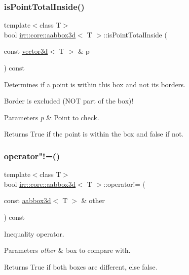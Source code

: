 \subsubsection{\texorpdfstring{is\+Point\+Total\+Inside()}{isPointTotalInside()}}
{\footnotesize\ttfamily template$<$class T$>$ \\
bool \hyperlink{classirr_1_1core_1_1aabbox3d}{irr\+::core\+::aabbox3d}$<$ T $>$\+::is\+Point\+Total\+Inside (\begin{DoxyParamCaption}\item[{const \hyperlink{classirr_1_1core_1_1vector3d}{vector3d}$<$ T $>$ \&}]{p }\end{DoxyParamCaption}) const\hspace{0.3cm}{\ttfamily [inline]}}



Determines if a point is within this box and not its borders. 

Border is excluded (N\+OT part of the box)! 
\begin{DoxyParams}{Parameters}
{\em p} & Point to check. \\
\hline
\end{DoxyParams}
\begin{DoxyReturn}{Returns}
True if the point is within the box and false if not. 
\end{DoxyReturn}
\mbox{\label{classirr_1_1core_1_1aabbox3d_a985eec4fb632d7c8ef5a5577209690b3}} 
\subsubsection{\texorpdfstring{operator"!=()}{operator!=()}}
{\footnotesize\ttfamily template$<$class T$>$ \\
bool \hyperlink{classirr_1_1core_1_1aabbox3d}{irr\+::core\+::aabbox3d}$<$ T $>$\+::operator!= (\begin{DoxyParamCaption}\item[{const \hyperlink{classirr_1_1core_1_1aabbox3d}{aabbox3d}$<$ T $>$ \&}]{other }\end{DoxyParamCaption}) const\hspace{0.3cm}{\ttfamily [inline]}}



Inequality operator. 


\begin{DoxyParams}{Parameters}
{\em other} & box to compare with. \\
\hline
\end{DoxyParams}
\begin{DoxyReturn}{Returns}
True if both boxes are different, else false. 
\end{DoxyReturn}
\mbox{\label{classirr_1_1core_1_1aabbox3d_ac77180d63cc1726d0dec25e6f4cfd59c}} 
